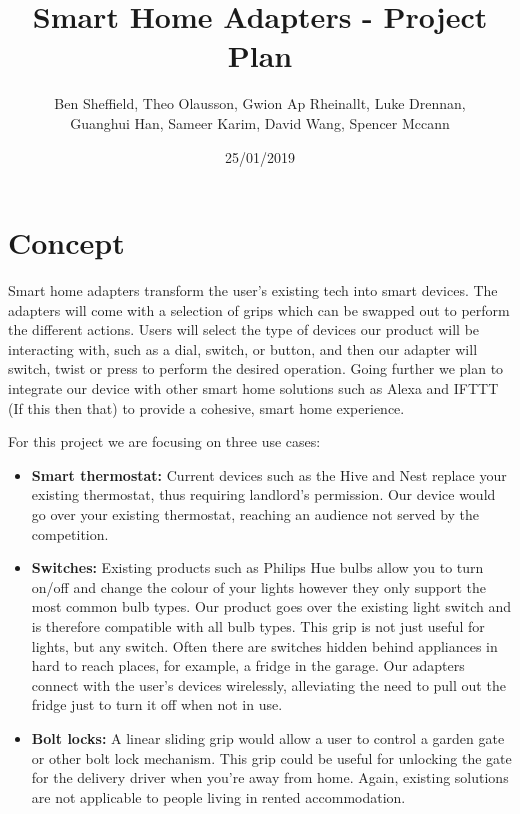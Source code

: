 \documentclass[onecolumn]{IEEEtran}
\begin{document}
\title{Smart Home Adapters - Project Plan}
\author{Ben Sheffield, Theo Olausson, Gwion Ap Rheinallt, Luke Drennan, \\Guanghui Han, Sameer Karim, David Wang, Spencer Mccann}
\date{25/01/2019} %

\maketitle

\section{Concept}
Smart home adapters transform the user’s existing tech into smart devices. The adapters will come with a selection of grips which can be swapped out to perform the different actions. Users will select the type of devices our product will be interacting with, such as a dial, switch, or button, and then our adapter will switch, twist or press to perform the desired operation. Going further we plan to integrate our device with other smart home solutions such as Alexa and IFTTT (If this then that) to provide a cohesive, smart home experience.

For this project we are focusing on three use cases:

\begin{itemize}
    \item \textbf{Smart thermostat:} Current devices such as the Hive and Nest replace your existing thermostat, thus requiring landlord’s permission. Our device would go over your existing thermostat, reaching an audience not served by the competition.
    \item \textbf{Switches:} Existing products such as Philips Hue bulbs allow you to turn on/off and change the colour of your lights however they only support the most common bulb types. Our product goes over the existing light switch and is therefore compatible with all bulb types. This grip is not just useful for lights, but any switch. Often there are switches hidden behind appliances in hard to reach places, for example, a fridge in the garage. Our adapters connect with the user’s devices wirelessly, alleviating the need to pull out the fridge just to turn it off when not in use.
    \item \textbf{Bolt locks:} A linear sliding grip would allow a user to control a garden gate or other bolt lock mechanism. This grip could be useful for unlocking the gate for the delivery driver when you’re away from home. Again, existing solutions are not applicable to people living in rented accommodation.
\end{itemize}
\end{document}
